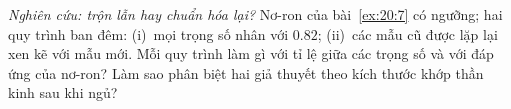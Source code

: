 \begin{exercise}[\lvlC]
\label{ex:20:8}
\emph{Nghiên cứu: trộn lẫn hay chuẩn hóa lại?} Nơ-ron của bài~\ref{ex:20:7} có ngưỡng; hai quy trình ban đêm: (i)~mọi trọng số nhân với $0.82$; (ii)~các mẫu cũ được lặp lại xen kẽ với mẫu mới. Mỗi quy trình làm gì với tỉ lệ giữa các trọng số và với đáp ứng của nơ-ron? Làm sao phân biệt hai giả thuyết theo kích thước khớp thần kinh sau khi ngủ?
\end{exercise}
